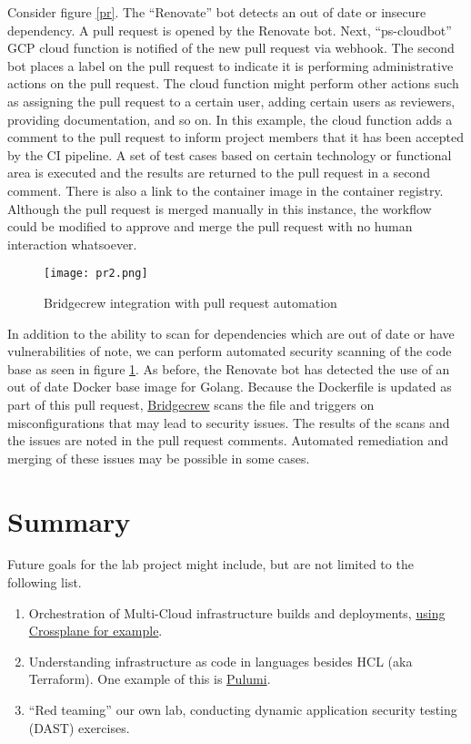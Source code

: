 Consider figure \ref{pr}. The ``Renovate'' bot detects an out of date or insecure dependency. A pull request is opened by the Renovate bot. 
Next, ``ps-cloudbot'' GCP cloud function is notified of the new pull request via webhook. The second bot places a label on the pull request to indicate
it is performing administrative actions on the pull request. The cloud function might perform other actions such as assigning the pull request to a certain user,
adding certain users as reviewers, providing documentation, and so on. In this example, the cloud function adds a comment to the pull request to inform
project members that it has been accepted by the CI pipeline. A set of test cases based on certain technology or functional area is executed and the
results are returned to the pull request in a second comment. There is also a link to the container image in the container registry. Although the pull
request is merged manually in this instance, the workflow could be modified to approve and merge the pull request with no human interaction whatsoever.

\begin{figure}[H]
	\texttt{[image: pr2.png]}
	\caption{Bridgecrew integration with pull request automation}
	\label{pr2}
\end{figure}


In addition to the ability to scan for dependencies which are out of date or have vulnerabilities of note, we can perform automated security scanning
of the code base as seen in figure \ref{pr2}. As before, the Renovate bot has detected the use of an out of date Docker base image for Golang. Because
the Dockerfile is updated as part of this pull request, \href{https://docs.bridgecrew.io/docs}{Bridgecrew} scans the file and triggers on misconfigurations that may lead to security issues.
The results of the scans and the issues are noted in the pull request comments. Automated remediation and merging of these issues may be possible in
some cases.


\section{\label{sec:Summary}Summary}
\vspace{2mm}
Future goals for the lab project might include, but are not limited to the following list.
\vspace{2mm}
\begin{raggedright}
	\begin{enumerate}
		\item Orchestration of Multi-Cloud infrastructure builds and deployments, \href{https://crossplane.io/docs/v1.3/}{using Crossplane for example}.
		\item Understanding infrastructure as code in languages besides HCL (aka Terraform). One example of this is \href{https://www.pulumi.com/}{Pulumi}.
		\item ``Red teaming'' our own lab, conducting dynamic application security testing (DAST) exercises.
	\end{enumerate}
\end{raggedright}
\vspace{2mm}


\clearpage
\begin{versionhistory}
\end{versionhistory}
\nocite{*}




